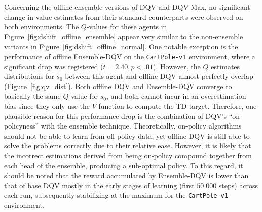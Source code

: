 Concerning the offline ensemble versions of DQV and DQV-Max, no
significant change in value estimates from their standard counterparts
were observed on both environments. The $Q$-values for these agents in
Figure~\ref{fig:dshift_offline_ensemble} appear very similar to the
non-ensemble variants in Figure~\ref{fig:dshift_offline_normal}. One
notable exception is the performance of offline Ensemble-DQV on the
\texttt{CartPole-v1} environment, where a significant drop was
registered ($t=2.40,p<.01$). However, the $Q$ estimates distributions
for $s_0$ between this agent and offline DQV almost perfectly
overlap (Figure~\ref{fig:qv_dist}). Both offline
DQV and Ensemble-DQV converge to basically the same $Q$-value for
$s_0$, and both cannot incur in an overestimation bias since they only
use the $V$ function to compute the TD-target. Therefore, one
plausible reason for this performance drop is the combination of DQV's
``on-policyness'' with the ensemble technique. Theoretically,
on-policy algorithms should not be able to learn from off-policy data,
yet offline DQV is still able to solve the problems correctly due to
their relative ease. However, it is likely that the incorrect
estimations derived from being on-policy compound together from each
head of the ensemble, producing a sub-optimal policy. To this regard,
it should be noted that the reward accumulated by Ensemble-DQV is
lower than that of base DQV mostly in the early stages of learning
(first $50 \; 000$ steps) across each run, subsequently stabilizing at
the
maximum for the \texttt{CartPole-v1} environment.


